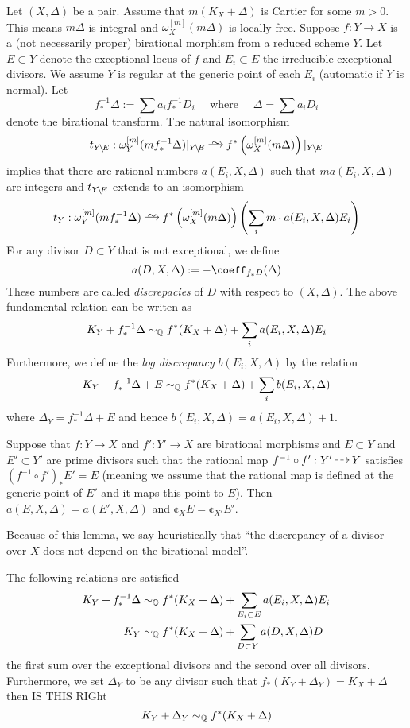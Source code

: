 \documentclass[12pt]{article}
\begin{document}
\begin{defn}
Let $(X, \Delta)$ be a pair. Assume that $m (K_X + \Delta)$ is Cartier for some $m > 0$. This means $m \Delta$ is integral and $\omega_X^{[m]}(m \Delta)$ is locally free. Suppose $f : Y \to X$ is a (not necessarily proper) birational morphism from a reduced scheme $Y$. Let $E \subset Y$ denote the exceptional locus of $f$ and $E_i \subset E$ the irreducible exceptional divisors. We assume $Y$ is regular at the generic point of each $E_i$ (automatic if $Y$ is normal). Let 
\[ f_*^{-1} \Delta := \sum a_i f_*^{-1} D_i \quad \text{ where } \quad \Delta = \sum a_i D_i \]
denote the birational transform. The natural isomorphism
\[ t_{Y \sm E} : \omega_Y^{[m]}(m f_*^{-1} \Delta)|_{Y \sm E} \iso f^* \left( \omega_X^{[m]}(m \Delta) \right) |_{Y \sm E} \]
implies that there are rational numbers $a(E_i, X, \Delta)$ such that $m a(E_i, X, \Delta)$ are integers and $t_{Y \! \setminus \! E}$ extends to an isomorphism
\[ t_Y : \omega_Y^{[m]}(m f_*^{-1} \Delta) \iso f^* \left( \omega_X^{[m]}(m \Delta) \right) \left( \sum_i m \cdot a(E_i, X, \Delta) E_i \right) \]
For any divisor $D \subset Y$ that is not exceptional, we define 
\[ a(D, X, \Delta) := - \coeff_{f_* D}(\Delta) \]
These numbers are called \textit{discrepacies} of $D$ with respect to $(X, \Delta)$. The above fundamental relation can be writen as
\[ K_Y + f_*^{-1} \Delta \sim_{\mathbb{Q}} f^* (K_X + \Delta) + \sum_i a(E_i, X, \Delta) E_i \]
Furthermore, we define the \textit{log discrepancy} $b(E_i, X, \Delta)$ by the relation
\[ K_Y + f_*^{-1} \Delta + E \sim_{\mathbb{Q}} f^* (K_X + \Delta
) + \sum_i b(E_i, X, \Delta) \]
where $\Delta_Y = f_*^{-1} \Delta + E$ and hence $b(E_i, X, \Delta) = a(E_i, X, \Delta) + 1$.
\end{defn}

\begin{lemma}
Suppose that $f : Y \to X$ and $f' : Y' \to X$ are birational morphisms and $E \subset Y$ and $E' \subset Y'$ are prime divisors such that the rational map $f^{-1} \circ f' : Y' \rat Y$ satisfies $(f^{-1} \circ f')_* E' = E$ (meaning we assume that the rational map is defined at the generic point of $E'$ and it maps this point to $E$). Then $a(E, X, \Delta) = a(E', X, \Delta)$ and $\cent_X E = \cent_{X'} E'$.
\end{lemma}

\begin{rmk}
Because of this lemma, we say heuristically that ``the discrepancy of a divisor over $X$ does not depend on the birational model''. 
\end{rmk}
\begin{rmk}
The following relations are satisfied
\begin{align*}
K_Y + f_*^{-1} \Delta & \sim_{\mathbb{Q}} f^* (K_X + \Delta) + \sum_{E_i \subset E} a(E_i, X, \Delta) E_i
\\
K_Y  & \sim_{\mathbb{Q}} f^* (K_X + \Delta) + \sum_{D \subset Y} a(D, X, \Delta) D
\end{align*}
the first sum over the exceptional divisors and the second over all divisors. Furthermore, we set $\Delta_Y$ to be any divisor such that $f_* (K_Y + \Delta_Y) = K_X + \Delta$ then {\color{red} IS THIS RIGht}
\[ K_Y + \Delta_Y \sim_{\mathbb{Q}} f^* (K_X + \Delta) \]
\end{rmk}
\end{document}
